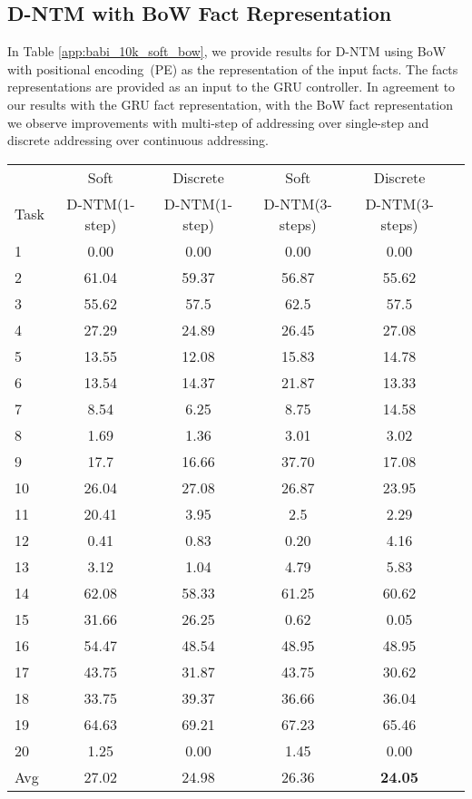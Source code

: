 \documentclass[12pt]{article}
\begin{document}
\subsection{D-NTM with BoW Fact Representation}
In Table \ref{app:babi_10k_soft_bow}, we provide results for D-NTM using BoW with positional encoding~(PE) \cite{sukhbaatarend} as the representation of the input facts. The facts representations are provided as an input to the GRU controller. In agreement to our results with the 
GRU fact representation, with the BoW fact representation we observe improvements with multi-step of addressing over single-step and discrete addressing over continuous addressing.

\begin{table*}[htbp]
\vspace{-2mm}
  \centering
  \footnotesize 
\begin{tabular}{ | l || c |c | c | c | c |}
\hline
&  Soft & Discrete & Soft & Discrete  \\
Task & D-NTM(1-step) & D-NTM(1-step)  & D-NTM(3-steps) & D-NTM(3-steps)\\ \hline

1 & 0.00 & 0.00 & 0.00 & 0.00\\
2 & 61.04 & 59.37 & 56.87 & 55.62 \\
3 & 55.62 & 57.5 & 62.5 & 57.5 \\
4 & 27.29 & 24.89 & 26.45 & 27.08 \\
5 & 13.55 & 12.08 & 15.83 & 14.78 \\
6 & 13.54 & 14.37 & 21.87 & 13.33 \\
7 & 8.54 & 6.25 & 8.75 & 14.58 \\
8 & 1.69 & 1.36 & 3.01 & 3.02 \\
9 & 17.7 & 16.66 & 37.70 & 17.08 \\
10 & 26.04 & 27.08 & 26.87 & 23.95 \\
11 & 20.41 & 3.95 & 2.5 & 2.29 \\
12 & 0.41 & 0.83 & 0.20 & 4.16 \\
13  & 3.12 & 1.04 & 4.79 & 5.83 \\
14 & 62.08 & 58.33 & 61.25 & 60.62 \\
15 & 31.66 & 26.25 & 0.62 & 0.05 \\
16 & 54.47 & 48.54 & 48.95 & 48.95 \\
17  & 43.75 & 31.87 & 43.75 & 30.62 \\
18 & 33.75 & 39.37 & 36.66 & 36.04\\
19 & 64.63 & 69.21 & 67.23 & 65.46\\
20 & 1.25 & 0.00 & 1.45 & 0.00 \\\hline
Avg & 27.02 & 24.98 & 26.36 & {\bf 24.05} \\\hline

\end{tabular}
\caption{Test error rates (\%) on the 20 bAbI QA tasks for models using 10k training examples with the GRU controller and representations of facts are obtained with BoW using positional encoding.}
\label{app:babi_10k_soft_bow}
\end{table*}
\end{document}
